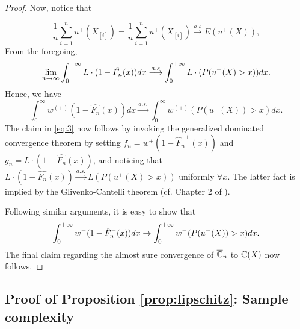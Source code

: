 \begin{proof}
Now, notice that 

$$
\frac{1}{n}
\sum_{i=1}^n u^+(X_{[i]})
=
\frac{1}{n}
\sum_{i=1}^n u^+(X_{[i]})
\overset{a.s}\longrightarrow 
E(u^+(X)),
$$
From the foregoing,
$$
\lim_{n\rightarrow \infty} \int_0^{+\infty} L\cdot(1-\hat{F_n}(x)) dx
\overset{a.s} \longrightarrow
\int_0^{+\infty} L \cdot(P(u^+(X)>x)) dx.$$
Hence, we have 
$$
\int_0^\infty w^{(+)}(1-\hat{F_n}(x)) dx \xrightarrow{a.s.} 
\int_0^\infty w^{(+)}(P(u^+(X))>x) dx.
$$
The claim in \eqref{eq:3} now follows by invoking the generalized dominated convergence theorem by setting $f_n = w^+(1-{\hat F_n}^+(x))$ and $g_n = L\cdot(1-\hat{F_n}(x))$, and noticing that $L\cdot(1-\hat{F_n}(x)) \xrightarrow{a.s.} L(P(u^+(X)>x))$ uniformly $\forall x$. The latter fact is implied by the Glivenko-Cantelli theorem (cf. Chapter 2 of \cite{wasserman2006}).

Following similar arguments, it is easy to show that 
$$
\int_0^{+\infty} w^-(1-{\hat F_n}^-(x))  dx \rightarrow \int_0^{+\infty} w^-(P(u^-(X))>x) dx.
$$
The final claim regarding the almost sure convergence of $\overline {\mathbb{C}}_n$ to $\mathbb{C}(X)$ now follows.
\end{proof}

\subsection*{Proof of Proposition \ref{prop:lipschitz}: Sample complexity}

